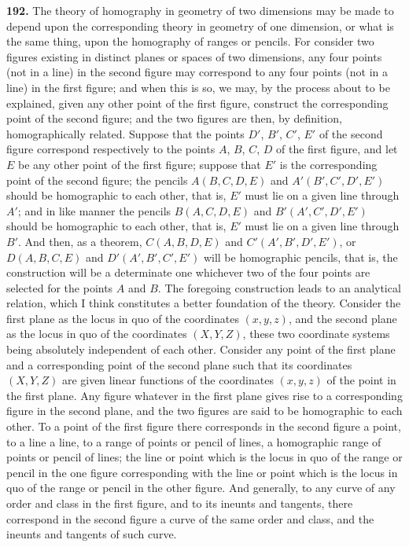 \documentclass[11pt,a4paper]{article}
\begin{document}
\textbf{192.} The theory of homography in geometry of two dimensions may be made to
depend upon the corresponding theory in geometry of one dimension, or what is the
same thing, upon the homography of ranges or pencils. For consider two figures existing
in distinct planes or spaces of two dimensions, any four points (not in a line) in the
second figure may correspond to any four points (not in a line) in the first figure; and
when this is so, we may, by the process about to be explained, given any other point
of the first figure, construct the corresponding point of the second figure; and the
two figures are then, by definition, homographically related. Suppose that the points
$D'$, $B'$, $C'$, $E'$ of the second figure correspond respectively to the points $A$, $B$, $C$, $D$ of
the first figure, and let $E$ be any other point of the first figure; suppose that $E'$ is the
corresponding point of the second figure; the pencils $A(B,C,D,E)$ and $A'(B',C',D',E')$
should be homographic to each other, that is, $E'$ must lie on a given line through $A'$;
and in like manner the pencils $B(A,C,D,E)$ and $B'(A',C',D',E')$ should be homographic
to each other, that is, $E'$ must lie on a given line through $B'$. And then, as a theorem,
$C(A,B,D,E)$ and $C'(A',B',D',E')$, or $D(A,B,C,E)$ and $D'(A',B',C',E')$ will be homographic
pencils, that is, the construction will be a determinate one whichever two of the four
points are selected for the points $A$ and $B$. The foregoing construction leads to an
analytical relation, which I think constitutes a better foundation of the theory. Consider
the first plane as the locus in quo of the coordinates $(x,y,z)$, and the second plane as
the locus in quo of the coordinates $(X,Y,Z)$, these two coordinate systems being
absolutely independent of each other. Consider any point of the first plane and a
corresponding point of the second plane such that its coordinates $(X,Y,Z)$ are given
linear functions of the coordinates $(x,y,z)$ of the point in the first plane. Any figure
whatever in the first plane gives rise to a corresponding figure in the second plane, and
the two figures are said to be homographic to each other. To a point of the first figure
there corresponds in the second figure a point, to a line a line, to a range of points or
pencil of lines, a homographic range of points or pencil of lines; the line or point which
is the locus in quo of the range or pencil in the one figure corresponding with the line
or point which is the locus in quo of the range or pencil in the other figure. And
generally, to any curve of any order and class in the first figure, and to its ineunts and
tangents, there correspond in the second figure a curve of the same order and class, and
the ineunts and tangents of such curve.
\end{document}

